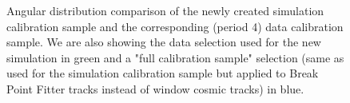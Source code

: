 \documentclass[12pt]{article}
\begin{document}
\begin{figure}[!ht]

\caption{Angular distribution comparison of the newly created simulation calibration sample and the corresponding (period 4) data calibration sample. We are also showing the data selection used for the new simulation in green and a "full calibration sample" selection (same as used for the simulation calibration sample but applied to Break Point Fitter tracks instead of window cosmic tracks) in blue.}
\label{figDataMCComparison_cosXcosY}
\end{figure}
\end{document}

